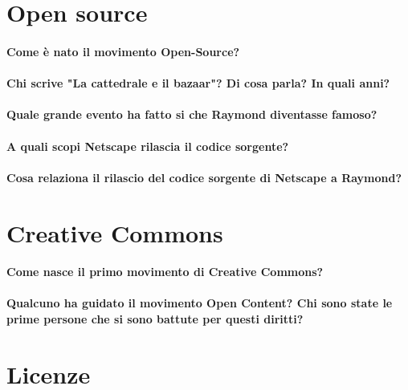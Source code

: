 \documentclass[a4paper]{article}
\begin{document}
	
	\section{Open source}
	
		\paragraph{Come è nato il movimento Open-Source?}
		
		\paragraph{Chi scrive "La cattedrale e il bazaar"? Di cosa parla? In quali anni?}
		
		\paragraph{Quale grande evento ha fatto si che Raymond diventasse famoso?}
		
		\paragraph{A quali scopi Netscape rilascia il codice sorgente?}
		
		\paragraph{Cosa relaziona il rilascio del codice sorgente di Netscape a Raymond?}
		
		
	\section{Creative Commons}
	
		\paragraph{Come nasce il primo movimento di Creative Commons?}
		
		\paragraph{Qualcuno ha guidato il movimento Open Content? Chi sono state le prime persone che si sono battute per questi diritti?}
		
		
		
		
	\section{Licenze}
	
\end{document}
